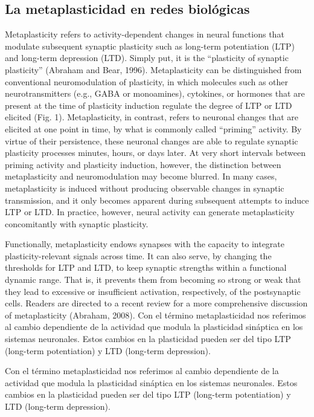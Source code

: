 \documentclass[10pt,a4paper, twocolumn]{report}
\begin{document}
\subsection{La metaplasticidad en redes biológicas}
Metaplasticity refers to activity-dependent changes in neural functions that modulate subsequent synaptic plasticity such as long-term potentiation (LTP) and long-term depression (LTD). Simply put, it is the “plasticity of synaptic plasticity” (Abraham and Bear, 1996). Metaplasticity can be distinguished from conventional neuromodulation of plasticity, in which molecules such as other neurotransmitters (e.g., GABA or monoamines), cytokines, or hormones that are present at the time of plasticity induction regulate the degree of LTP or LTD elicited (Fig. 1). Metaplasticity, in contrast, refers to neuronal changes that are elicited at one point in time, by what is commonly called “priming” activity. By virtue of their persistence, these neuronal changes are able to regulate synaptic plasticity processes minutes, hours, or days later. At very short intervals between priming activity and plasticity induction, however, the distinction between metaplasticity and neuromodulation may become blurred. In many cases, metaplasticity is induced without producing observable changes in synaptic transmission, and it only becomes apparent during subsequent attempts to induce LTP or LTD. In practice, however, neural activity can generate metaplasticity concomitantly with synaptic plasticity.

Functionally, metaplasticity endows synapses with the capacity to integrate plasticity-relevant signals across time. It can also serve, by changing the thresholds for LTP and LTD, to keep synaptic strengths within a functional dynamic range. That is, it prevents them from becoming so strong or weak that they lead to excessive or insufficient activation, respectively, of the postsynaptic cells. Readers are directed to a recent review for a more comprehensive discussion of metaplasticity (Abraham, 2008). 
Con el término metaplasticidad nos referimos al cambio dependiente de la actividad que modula la plasticidad sináptica en los sistemas neuronales. Estos cambios en la plasticidad pueden ser del tipo LTP (long-term potentiation) y LTD (long-term depression).

Con el término metaplasticidad nos referimos al cambio dependiente de la actividad que modula la plasticidad sináptica en los sistemas neuronales. Estos cambios en la plasticidad pueden ser del tipo LTP (long-term potentiation) y LTD (long-term depression).
\end{document}
